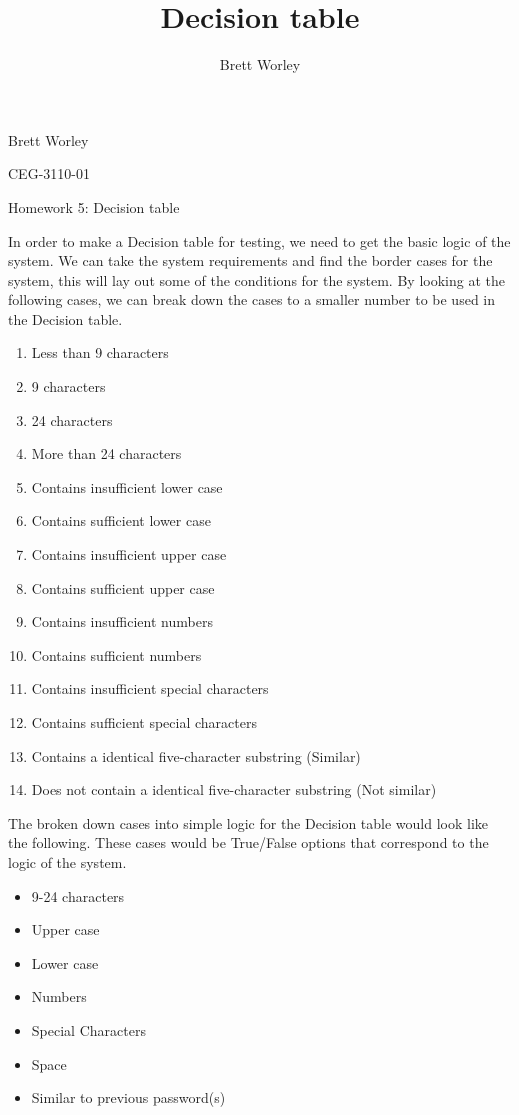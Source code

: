 \documentclass[12pt,letterpaper]{article}
\author{Brett Worley}
\title{Decision table}
\begin{document}
Brett Worley

CEG-3110-01

\centerline{ Homework 5: Decision table}

In order to make a Decision table for testing, we need to get the basic logic of the system. We can take the system requirements and 
find the border cases for the system, this will lay out some of the conditions for
the system. By looking at the following cases, we can break down the cases to a smaller number
to be used in the Decision table.

\begin{enumerate}
\item Less than 9 characters
\item 9 characters
\item 24 characters
\item More than 24 characters
\item Contains insufficient lower case
\item Contains sufficient lower case
\item Contains insufficient upper case
\item Contains sufficient upper case
\item Contains insufficient numbers
\item Contains sufficient numbers
\item Contains insufficient special characters
\item Contains sufficient special characters
\item Contains a identical five-character substring (Similar)
\item Does not contain a identical five-character substring (Not similar)
\end{enumerate}

The broken down cases into simple logic for the Decision table would look like the following.
These cases would be True/False options that correspond to the logic of the system.

\begin{itemize}
\item 9-24 characters
\item Upper case
\item Lower case
\item Numbers
\item Special Characters
\item Space
\item Similar to previous password(s)
\end{itemize}
\end{document}
